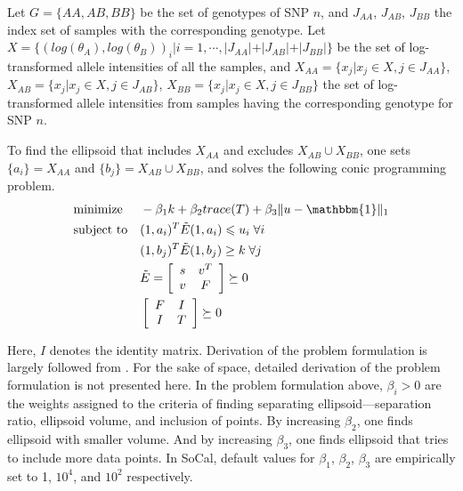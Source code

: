 \documentclass{scrartcl}
\begin{document}
\par
Let $G=\{AA,AB,BB\}$ be the set of genotypes of SNP $n$, and $J_{AA}$,
$J_{AB}$, $J_{BB}$ the index set of samples with the corresponding genotype.
Let $X=\{(log(\theta_A),log(\theta_B))_i|i=1,\cdots,
|J_{AA}|+|J_{AB}|+|J_{BB}|\}$ be the set of log-transformed allele intensities
of all the samples, and $X_{AA}=\{x_j|x_j \in X, j \in J_{AA}\}$,
$X_{AB}=\{x_j|x_j \in X, j \in J_{AB}\}$,
$X_{BB}=\{x_j|x_j \in X, j \in J_{BB}\}$ the set of log-transformed allele
intensities from samples having the corresponding genotype for SNP $n$.

\par
To find the ellipsoid that includes $X_{AA}$ and excludes
$X_{AB} \cup X_{BB}$, one
sets $\{a_i\}=X_{AA}$ and $\{b_j\}=X_{AB} \cup X_{BB}$, and
solves the following conic programming problem.
\begin{equation*}
\begin{aligned}
& \text{minimize}
&& -{\beta_{1}}k+{\beta_{2}} trace(T)+\beta_{3} \|u-\mathbbm{1}\|_1 \\  
& \text{subject to}
&& (1,a_i)^T\tilde{E}(1,a_i)\leqslant u_i \; \forall i \\
&&&(1,b_j)^T\tilde{E}(1,b_j) \ge k \; \forall j \\
&&&\tilde{E}=
    \left[
        \begin{array}{cc}
            s & v^T \\
            v & F
        \end{array}
    \right] \succeq 0 \\
&&&\left[
        \begin{array}{cc}
            F & I \\
            I & T
        \end{array}
    \right] \succeq 0
\end{aligned}
\end{equation*}

\par
Here, $I$ denotes the identity matrix.
Derivation of the problem formulation is largely followed from
\cite{glineur1998}.
For the sake of space, detailed derivation of the problem formulation is not
presented here.
In the problem formulation above, $\beta_{i} > 0$ are the weights assigned to
the criteria of finding separating ellipsoid---separation ratio,
ellipsoid volume, and inclusion of points.
By increasing $\beta_2$, one finds ellipsoid with
smaller volume.
And by increasing $\beta_3$, one finds ellipsoid that tries to
include more data points.
In SoCal, default values for $\beta_1$, $\beta_2$, $\beta_3$ are
empirically set to 1, $10^4$, and $10^2$ respectively.
\end{document}
